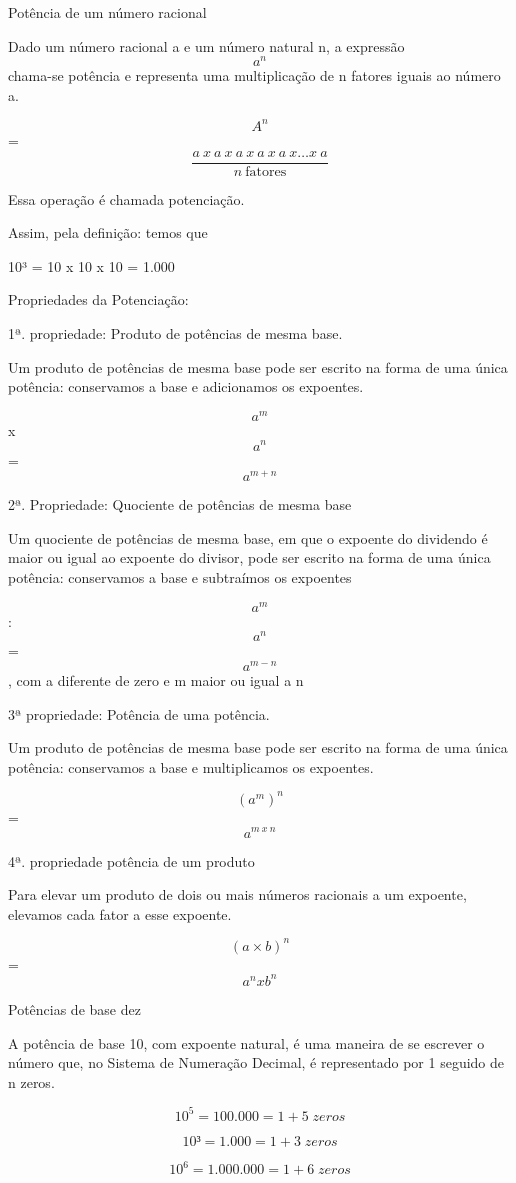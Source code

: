 Potência de um número racional

Dado um número racional a e um número natural n, a expressão \[ a^n \]
chama-se potência e representa uma multiplicação de n fatores iguais ao
número a.

\[A^n\] =
\[\frac{a\ x\ a\ x\ a\ x\ a\ x\ a\ x\ldots x\ a}{n\ \text{fatores}}\]

Essa operação é chamada potenciação.

Assim, pela definição: temos que

10³ = 10 x 10 x 10 = 1.000

Propriedades da Potenciação:

1ª. propriedade: Produto de potências de mesma base.

Um produto de potências de mesma base pode ser escrito na forma de uma
única potência: conservamos a base e adicionamos os expoentes.

\[a^m\] x \[a^n\] = \[a^{m+n}\]

2ª. Propriedade: Quociente de potências de mesma base

Um quociente de potências de mesma base, em que o expoente do dividendo
é maior ou igual ao expoente do divisor, pode ser escrito na forma de
uma única potência: conservamos a base e subtraímos os expoentes

\[a^m\] : \[a^n\] = \[a^{m-n}\] , com a diferente de zero e m maior ou
igual a n

3ª propriedade: Potência de uma potência.

Um produto de potências de mesma base pode ser escrito na forma de uma
única potência: conservamos a base e multiplicamos os expoentes.

\[(a^m)^n\] = \[a^{m\ x\ n}\]

4ª. propriedade potência de um produto

Para elevar um produto de dois ou mais números racionais a um expoente,
elevamos cada fator a esse expoente.

\[(a \times b)^n\]= \[a^n x b^n\]

Potências de base dez

A potência de base 10, com expoente natural, é uma maneira de se
escrever o número que, no Sistema de Numeração Decimal, é representado
por 1 seguido de n zeros.

\[10^5 = 100.000 = 1 + 5 \;zeros\]

\[10³ = 1.000 = 1+ 3 \;zeros\]

\[10 ^6= 1.000.000 = 1+ 6 \;zeros\]

